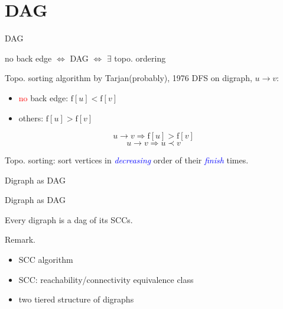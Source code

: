 \section{DAG}

\begin{frame}{DAG}
  \begin{center}
    no back edge $\iff$ DAG $\iff$ $\exists$ topo. ordering
  \end{center}

  \begin{block}{Topo. sorting algorithm by Tarjan(probably), 1976}
    DFS on digraph, $u \to v$:
    \begin{itemize}
      \item \textcolor{red}{no} back edge: $\text{f}[u] < \text{f}[v]$
      \item others: $\text{f}[u] > \text{f}[v]$
    \end{itemize}

    \[ u \to v \Rightarrow \text{f}[u] > \text{f}[v] \]
    \[ u \to v \Rightarrow u \prec v \] 

    \begin{center}
      Topo. sorting: sort vertices in \textcolor{blue}{\emph{decreasing}} order of their \textcolor{blue}{\emph{finish}} times.
    \end{center}
  \end{block}
\end{frame}
\begin{frame}{Digraph as DAG}
  \begin{exampleblock}{Digraph as DAG }
    \begin{theorem}
      Every digraph is a dag of its SCCs.
    \end{theorem}
  \end{exampleblock}

  \begin{alertblock}{Remark.}
    \begin{itemize}
      \item SCC algorithm
      \item SCC: reachability/connectivity equivalence class
      \item two tiered structure of digraphs
    \end{itemize}
  \end{alertblock}
\end{frame}
